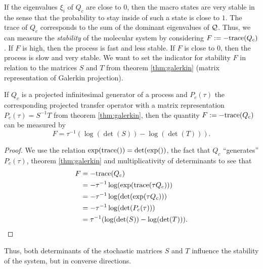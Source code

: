 If the eigenvalues $\xi_i$ of $Q_c$ are close to $0$, then the macro states are very stable in the sense that the probability to stay inside of such a state is close to $1$.
The trace of $Q_c$ corresponds to the sum of the dominant eigenvalues of $\mathcal{Q}$.
Thus, we can measure the \textit{stability} of the molecular system by considering $F := - \mathrm{trace}(Q_c)$.
If $F$ is high, then the process is fast and less stable. If $F$ is close to $0$, then the process is slow and very stable. 
We want to set the indicator for stability $F$ in relation to the matrices $S$ and $T$ from theorem \ref{thm:galerkin} (matrix representation of Galerkin projection).
\begin{lem}
If $Q_c$ is a projected infinitesimal generator of a process and $P_c(\tau)$ the corresponding projected transfer operator with a matrix representation $P_c(\tau) = S^{-1}T$ from theorem \ref{thm:galerkin}, then the quantity $F := - \mathrm{trace}(Q_c)$ can be measured by
\begin{equation*}
\label{thm:stability}
F = \tau^{-1}(\log(\det(S)) - \log(\det(T))).
\end{equation*}
\end{lem}
\begin{proof}
We use the relation $\exp(\mathrm{trace}()) = \det(\exp())$, the fact that $Q_c$ ``generates'' $P_c(\tau)$, theorem \ref{thm:galerkin} and multiplicativity of determinants to see that 
\begin{align*}
F & = - \mathrm{trace}(Q_c) \\
  & = -  \tau^{-1}\log(\exp(\mathrm{trace}(\tau Q_c))) \\
  & = -  \tau^{-1}\log(\det(\exp(\tau Q_c)))  \\
  & = -  \tau^{-1} \log(\det(P_c(\tau))) \\
  & = \tau^{-1}(\log(\det(S)) - \log(\det(T))).
\end{align*}
\end{proof}

Thus, both determinants of the stochastic matrices $S$ and $T$  influence the stability of the system, but in converse directions.

